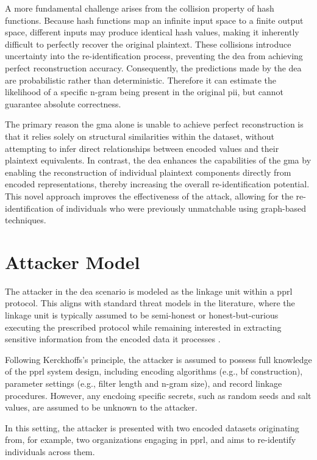 A more fundamental challenge arises from the collision property of hash functions.
Because hash functions map an infinite input space to a finite output space, different inputs may produce identical hash values, making it inherently difficult to perfectly recover the original plaintext.
These collisions introduce uncertainty into the re-identification process, preventing the \ac{dea} from achieving perfect reconstruction accuracy.
Consequently, the predictions made by the \ac{dea} are probabilistic rather than deterministic. Therefore it can estimate the likelihood of a specific n-gram being present in the original \ac{pii}, but cannot guarantee absolute correctness.

The primary reason the \ac{gma} alone is unable to achieve perfect reconstruction is that it relies solely on structural similarities within the dataset, without attempting to infer direct relationships between encoded values and their plaintext equivalents.
In contrast, the \ac{dea} enhances the capabilities of the \ac{gma} by enabling the reconstruction of individual plaintext components directly from encoded representations, thereby increasing the overall re-identification potential.
This novel approach improves the effectiveness of the attack, allowing for the re-identification of individuals who were previously unmatchable using graph-based techniques.


\section{Attacker Model}

The attacker in the \ac{dea} scenario is modeled as the linkage unit within a \ac{pprl} protocol.
This aligns with standard threat models in the literature, where the linkage unit is typically assumed to be semi-honest or honest-but-curious executing the prescribed protocol while remaining interested in extracting sensitive information from the encoded data it processes \cite{schaefer2024}.

Following Kerckhoffs’s principle, the attacker is assumed to possess full knowledge of the \ac{pprl} system design, including encoding algorithms (e.g., \ac{bf} construction), parameter settings (e.g., filter length and n-gram size), and record linkage procedures.
However, any encdoing specific secrets, such as random seeds and salt values, are assumed to be unknown to the attacker.

In this setting, the attacker is presented with two encoded datasets originating from, for example, two organizations engaging in \ac{pprl}, and aims to re-identify individuals across them.

